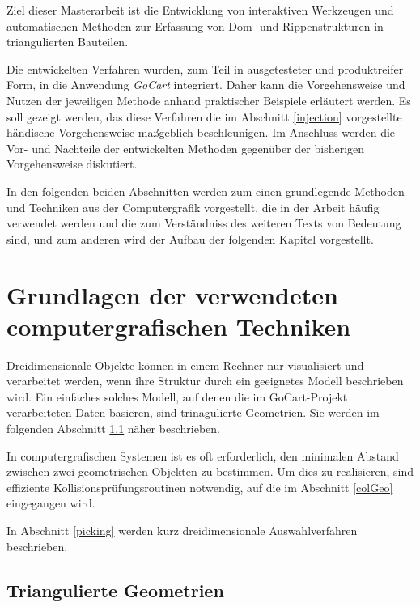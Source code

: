 Ziel dieser Masterarbeit ist die Entwicklung von interaktiven Werkzeugen und automatischen Methoden zur Erfassung von Dom- und Rippenstrukturen in triangulierten Bauteilen.

Die entwickelten Verfahren wurden, zum Teil in ausgetesteter und produktreifer Form, in die Anwendung \textit{GoCart} integriert. Daher kann die Vorgehensweise und Nutzen der jeweiligen Methode anhand praktischer Beispiele erl\"autert werden. Es soll gezeigt werden, das diese Verfahren die im Abschnitt \ref{injection} vorgestellte h\"andische Vorgehensweise ma{\ss}geblich beschleunigen. Im Anschluss werden die Vor- und Nachteile der entwickelten Methoden gegenüber der bisherigen Vorgehensweise diskutiert.

In den folgenden beiden Abschnitten werden zum einen grundlegende Methoden und Techniken aus der Computergrafik vorgestellt, die in der Arbeit h\"aufig verwendet werden und die zum Verst\"andniss des weiteren Texts von Bedeutung sind, und zum anderen wird der Aufbau der folgenden Kapitel vorgestellt.

\section{Grundlagen der verwendeten computergrafischen Techniken}

Dreidimensionale Objekte k\"onnen in einem Rechner nur visualisiert und verarbeitet werden, wenn ihre Struktur durch ein geeignetes Modell beschrieben wird. Ein einfaches solches Modell, auf denen die im GoCart-Projekt verarbeiteten Daten basieren, sind trinagulierte Geometrien. Sie werden im folgenden Abschnitt \ref{triGeo} n\"aher beschrieben.

In computergrafischen Systemen ist es oft erforderlich, den minimalen Abstand zwischen zwei geometrischen Objekten zu bestimmen. Um dies zu realisieren, sind effiziente Kollisionspr\"ufungsroutinen notwendig, auf die im Abschnitt \ref{colGeo} eingegangen wird.
 
In Abschnitt \ref{picking} werden kurz dreidimensionale Auswahlverfahren beschrieben.
 
\subsection{Triangulierte Geometrien}
\label{triGeo}

